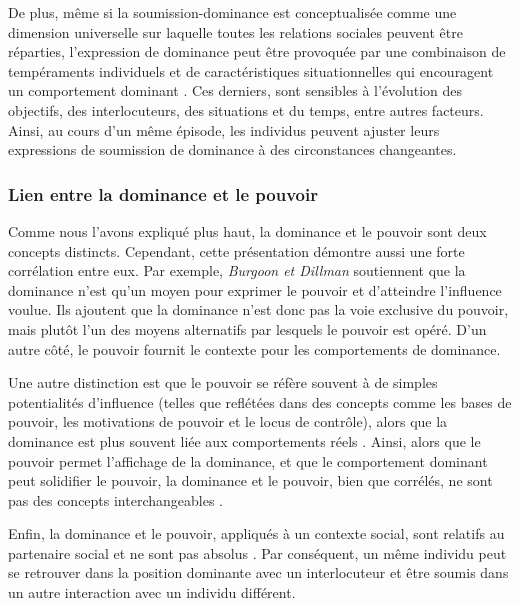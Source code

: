 		De plus, même si la soumission-dominance est conceptualisée comme une dimension universelle sur laquelle toutes les relations sociales peuvent être réparties, l'expression de dominance peut être provoquée par une combinaison de tempéraments individuels et de caractéristiques situationnelles	qui encouragent un comportement dominant \cite{burgoon2000interactionist}. Ces derniers, sont sensibles à l'évolution des objectifs, des interlocuteurs, des situations et du temps, entre autres facteurs.
		Ainsi, au cours d'un même épisode, les individus peuvent ajuster leurs expressions de soumission de dominance à des circonstances changeantes.
		
		\subsubsection{Lien entre la dominance et le pouvoir}
		Comme nous l'avons expliqué plus haut, la dominance et le pouvoir sont deux concepts distincts. Cependant, cette présentation démontre aussi une forte corrélation entre eux. 
		Par exemple, \emph{Burgoon et Dillman} \cite{burgoon1995interpersonal} soutiennent que la dominance n'est qu'un moyen pour exprimer le pouvoir et d'atteindre l'influence voulue.
		Ils ajoutent que la dominance n'est donc pas la voie exclusive du pouvoir, mais plutôt l'un des moyens alternatifs par lesquels le pouvoir est opéré. D'un autre côté, le pouvoir fournit le contexte pour les comportements de dominance. %
		
		Une autre distinction est que le pouvoir se réfère souvent à de simples potentialités d'influence (telles que reflétées dans des concepts comme les bases de pouvoir, les motivations de pouvoir et le locus de contrôle),
		alors que la dominance est plus souvent liée aux comportements réels \cite{dunbar2005perceptions,burgoon1998nature}. 
		Ainsi, alors que le pouvoir permet l'affichage de la dominance, et que le comportement dominant peut solidifier le pouvoir, la dominance et le pouvoir, bien que corrélés, ne sont pas des concepts interchangeables \cite{burgoon1995interpersonal}.
		
		Enfin, la dominance et le pouvoir, appliqués à un contexte social, sont relatifs au partenaire social et ne sont pas absolus \cite{dunbar2005perceptions}. Par conséquent, un même individu peut se retrouver dans la position dominante avec un interlocuteur et être soumis dans un autre interaction avec un individu différent.
		
